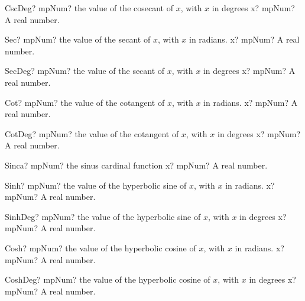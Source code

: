 \documentclass[12pt,a4paper,openany]{book}
\begin{document}
\begin{mpFunctionsExtract}
\mpFunctionOne
{CscDeg? mpNum? the value of the cosecant of $x$, with $x$ in degrees}
{x? mpNum? A real number.}
\end{mpFunctionsExtract}

\begin{mpFunctionsExtract}
\mpFunctionOne
{Sec? mpNum? the value of the secant of $x$, with $x$ in radians.}
{x? mpNum? A real number.}
\end{mpFunctionsExtract}

\begin{mpFunctionsExtract}
\mpFunctionOne
{SecDeg? mpNum? the value of the secant of $x$, with $x$ in degrees}
{x? mpNum? A real number.}
\end{mpFunctionsExtract}

\begin{mpFunctionsExtract}
\mpFunctionOne
{Cot? mpNum? the value of the cotangent of $x$, with $x$ in radians.}
{x? mpNum? A real number.}
\end{mpFunctionsExtract}

\begin{mpFunctionsExtract}
\mpFunctionOne
{CotDeg? mpNum? the value of the cotangent of $x$, with $x$ in degrees}
{x? mpNum? A real number.}
\end{mpFunctionsExtract}

\begin{mpFunctionsExtract}
\mpFunctionOne
{Sinca? mpNum? the sinus cardinal function}
{x? mpNum? A real number.}
\end{mpFunctionsExtract}

\begin{mpFunctionsExtract}
\mpFunctionOne
{Sinh? mpNum? the value of the hyperbolic sine of $x$, with $x$ in radians.}
{x? mpNum? A real number.}
\end{mpFunctionsExtract}

\begin{mpFunctionsExtract}
\mpFunctionOne
{SinhDeg? mpNum? the value of the hyperbolic sine of $x$, with $x$ in degrees}
{x? mpNum? A real number.}
\end{mpFunctionsExtract}

\begin{mpFunctionsExtract}
\mpFunctionOne
{Cosh? mpNum? the value of the hyperbolic cosine of $x$, with $x$ in radians.}
{x? mpNum? A real number.}
\end{mpFunctionsExtract}

\begin{mpFunctionsExtract}
\mpFunctionOne
{CoshDeg? mpNum? the value of the hyperbolic cosine of $x$, with $x$ in degrees}
{x? mpNum? A real number.}
\end{mpFunctionsExtract}
\end{document}
